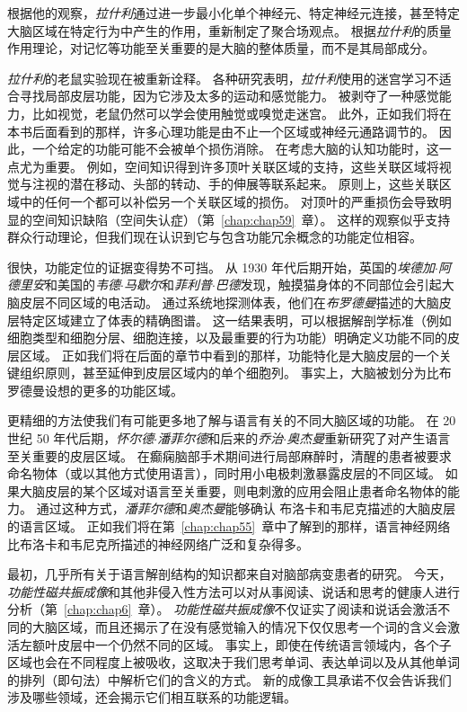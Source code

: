 根据他的观察，\textit{拉什利}通过进一步最小化单个神经元、特定神经元连接，甚至特定大脑区域在特定行为中产生的作用，重新制定了聚合场观点。
根据\textit{拉什利}的质量作用理论，对记忆等功能至关重要的是大脑的整体质量，而不是其局部成分。


\textit{拉什利}的老鼠实验现在被重新诠释。
各种研究表明，\textit{拉什利}使用的迷宫学习不适合寻找局部皮层功能，因为它涉及太多的运动和感觉能力。
被剥夺了一种感觉能力，比如视觉，老鼠仍然可以学会使用触觉或嗅觉走迷宫。
此外，正如我们将在本书后面看到的那样，许多心理功能是由不止一个区域或神经元通路调节的。
因此，一个给定的功能可能不会被单个损伤消除。
在考虑大脑的认知功能时，这一点尤为重要。
例如，空间知识得到许多顶叶关联区域的支持，这些关联区域将视觉与注视的潜在移动、头部的转动、手的伸展等联系起来。
原则上，这些关联区域中的任何一个都可以补偿另一个关联区域的损伤。
对顶叶的严重损伤会导致明显的空间知识缺陷（空间失认症）（第~\ref{chap:chap59}~章）。
这样的观察似乎支持群众行动理论，但我们现在认识到它与包含功能冗余概念的功能定位相容。


很快，功能定位的证据变得势不可挡。
从 1930 年代后期开始，英国的\textit{埃德加$\cdot$阿德里安}和美国的\textit{韦德$\cdot$马歇尔}和\textit{菲利普$\cdot$巴德}发现，触摸猫身体的不同部位会引起大脑皮层不同区域的电活动。
通过系统地探测体表，他们在\textit{布罗德曼}描述的大脑皮层特定区域建立了体表的精确图谱。
这一结果表明，可以根据解剖学标准（例如细胞类型和细胞分层、细胞连接，以及最重要的行为功能）明确定义功能不同的皮层区域。
正如我们将在后面的章节中看到的那样，功能特化是大脑皮层的一个关键组织原则，甚至延伸到皮层区域内的单个细胞列。
事实上，大脑被划分为比布罗德曼设想的更多的功能区域。


更精细的方法使我们有可能更多地了解与语言有关的不同大脑区域的功能。
在 20 世纪 50 年代后期，\textit{怀尔德$\cdot$潘菲尔德}和后来的\textit{乔治$\cdot$奥杰曼}重新研究了对产生语言至关重要的皮层区域。
在癫痫脑部手术期间进行局部麻醉时，清醒的患者被要求命名物体（或以其他方式使用语言），同时用小电极刺激暴露皮层的不同区域。
如果大脑皮层的某个区域对语言至关重要，则电刺激的应用会阻止患者命名物体的能力。
通过这种方式，\textit{潘菲尔德}和\textit{奥杰曼}能够确认 布洛卡和韦尼克描述的大脑皮层的语言区域。
正如我们将在第~\ref{chap:chap55}~章中了解到的那样，语言神经网络比布洛卡和韦尼克所描述的神经网络广泛和复杂得多。


最初，几乎所有关于语言解剖结构的知识都来自对脑部病变患者的研究。
今天，\textit{功能性磁共振成像}和其他非侵入性方法可以对从事阅读、说话和思考的健康人进行分析（第~\ref{chap:chap6}~章）。
\textit{功能性磁共振成像}不仅证实了阅读和说话会激活不同的大脑区域，而且还揭示了在没有感觉输入的情况下仅仅思考一个词的含义会激活左额叶皮层中一个仍然不同的区域。
事实上，即使在传统语言领域内，各个子区域也会在不同程度上被吸收，这取决于我们思考单词、表达单词以及从其他单词的排列（即句法）中解析它们的含义的方式。
新的成像工具承诺不仅会告诉我们涉及哪些领域，还会揭示它们相互联系的功能逻辑。


